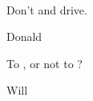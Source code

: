 \documentclass[aspectratio=169]{beamer}
\title{\deliv{\pp}{Presentation}}
\date{\datepp}
\begin{document}

\begin{frame}
\maketitle
\begin{center}
\names \\
\epigraph{Don't \tex{} and drive.}{Donald}
\end{center}
\end{frame}

\begin{frame}
\tableofcontents
\end{frame}









\begin{frame}
\github
\epigraph{To \cry, or not to \cry?}{Will}
\end{frame}

\end{document}
